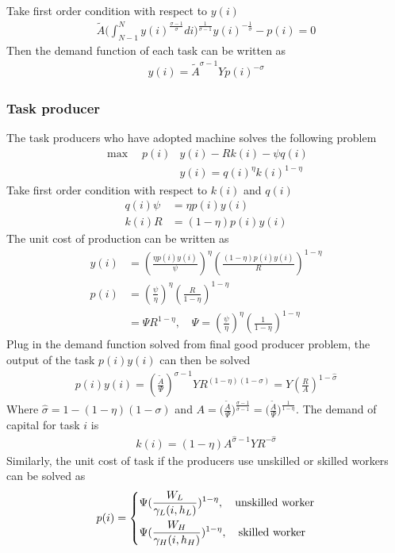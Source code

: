 \documentclass[12pt]{article}
\begin{document}
Take first order condition with respect to $y(i)$
\begin{align*}
\tilde{A}\Big(\int_{N-1}^{N}y(i)^{\frac{\sigma-1}{\sigma}}di\Big)^{\frac{1}{\sigma-1}}y(i)^{-\frac{1}{\sigma}}-p(i) = 0
\end{align*}
Then the demand function of each task can be written as 
\begin{align*}
y(i) = \tilde{A}^{\sigma-1}Yp(i)^{-\sigma}
\end{align*}

\subsubsection*{Task producer}
The task producers who have adopted machine solves the following problem 
\begin{align*}
\max \quad  p(i)&y(i)-Rk(i)-\psi q(i) \\
&y(i) = q(i)^{\eta}k(i)^{1-\eta}
\end{align*}
Take first order condition with respect to $k(i)$ and $q(i)$
\begin{align*}
q(i)\psi &= \eta p(i)y(i) \\
k(i)R &= (1-\eta)p(i)y(i) 
\end{align*}
The unit cost of production can be written as 
\begin{align*}
y(i) &= (\frac{\eta p(i)y(i)}{\psi})^{\eta}(\frac{(1-\eta)p(i)y(i)}{R})^{1-\eta} \\
p(i) &= (\frac{\psi}{\eta})^{\eta} (\frac{R}{1-\eta})^{1-\eta} \\
 	  &= \Psi R^{1-\eta}, \quad \Psi =  (\frac{\psi}{\eta})^{\eta} (\frac{1}{1-\eta})^{1-\eta}
\end{align*}
Plug in the demand function solved from final good producer problem, the output of the task $p(i)y(i)$ can then be solved 
\begin{align*}
p(i)y(i) = (\frac{\tilde{A}}{\Psi})^{\sigma-1}YR^{(1-\eta)(1-\sigma)} = Y(\frac{R}{A})^{1-\hat{\sigma}}
\end{align*}
Where $\hat{\sigma} = 1-(1-\eta)(1-\sigma)$ and $A = \Big(\frac{\tilde{A}}{\Psi}\Big)^{\frac{\sigma-1}{\hat{\sigma}-1}}  = \Big(\frac{\tilde{A}}{\Psi}\Big)^{\frac{1}{1-\eta}}$. 
The demand of capital for task $i$ is 
\begin{align*}
k(i) = (1-\eta)A^{\hat{\sigma}-1}YR^{-\hat{\sigma}}
\end{align*}
Similarly, the unit cost of task if the producers use unskilled or skilled workers can be solved as 
\begin{align*}
p(i) =
\begin{dcases}
\Psi(\frac{W_L}{\gamma_L(i,h_L)})^{1-\eta}, \quad \text{unskilled worker}  \\
\Psi(\frac{W_H}{\gamma_H(i,h_H)})^{1-\eta}, \quad \text{skilled worker}
\end{dcases}
\end{align*}
\end{document}
